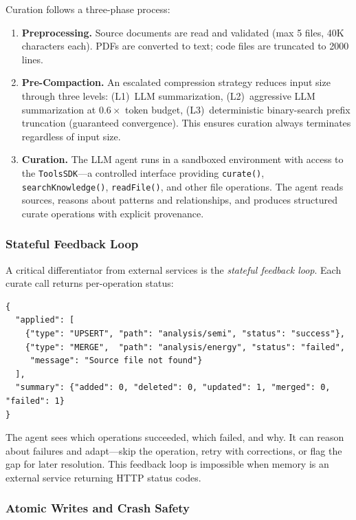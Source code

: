 \documentclass[11pt]{article}
\begin{document}
Curation follows a three-phase process:

\begin{enumerate}[leftmargin=*]
  \item \textbf{Preprocessing.}
    Source documents are read and validated (max 5 files, 40K characters each).
    PDFs are converted to text; code files are truncated to 2000 lines.

  \item \textbf{Pre-Compaction.}
    An escalated compression strategy reduces input size through three levels:
    (L1)~LLM summarization,
    (L2)~aggressive LLM summarization at $0.6\times$ token budget,
    (L3)~deterministic binary-search prefix truncation (guaranteed convergence).
    This ensures curation always terminates regardless of input size.

  \item \textbf{Curation.}
    The LLM agent runs in a sandboxed environment with access to the \texttt{ToolsSDK}---a
    controlled interface providing \texttt{curate()}, \texttt{searchKnowledge()},
    \texttt{readFile()}, and other file operations.
    The agent reads sources, reasons about patterns and relationships,
    and produces structured curate operations with explicit provenance.
\end{enumerate}

\subsubsection{Stateful Feedback Loop}

A critical differentiator from external services is the \emph{stateful feedback loop}.
Each curate call returns per-operation status:
\begin{lstlisting}[firstnumber=1]
{
  "applied": [
    {"type": "UPSERT", "path": "analysis/semi", "status": "success"},
    {"type": "MERGE",  "path": "analysis/energy", "status": "failed",
     "message": "Source file not found"}
  ],
  "summary": {"added": 0, "deleted": 0, "updated": 1, "merged": 0, "failed": 1}
}
\end{lstlisting}

The agent sees which operations succeeded, which failed, and why.
It can reason about failures and adapt---skip the operation, retry with corrections,
or flag the gap for later resolution.
This feedback loop is impossible when memory is an external service
returning HTTP status codes.

\subsubsection{Atomic Writes and Crash Safety}
\end{document}
